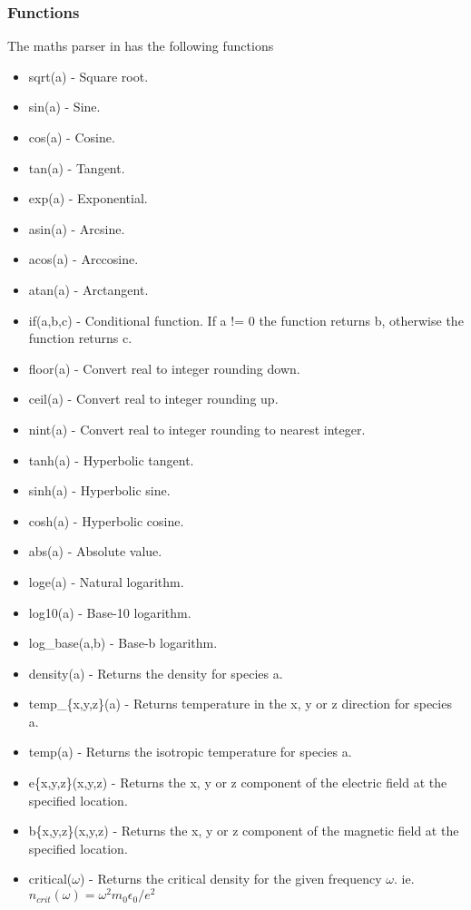 \subsubsection{Functions}
\label{sec:functions}
The maths parser in {\EPOCH} has the following functions
\begin{itemize}
\item sqrt(a) - Square root.
\item sin(a) - Sine.
\item cos(a) - Cosine.
\item tan(a) - Tangent.
\item exp(a) - Exponential.
\item asin(a) - Arcsine.
\item acos(a) - Arccosine.
\item atan(a) - Arctangent.
\item if(a,b,c) - Conditional function. If a != 0 the function returns b,
  otherwise the function returns c.
\item floor(a) - Convert real to integer rounding down.
\item ceil(a) - Convert real to integer rounding up.
\item nint(a) - Convert real to integer rounding to nearest integer.
\item tanh(a) - Hyperbolic tangent.
\item sinh(a) - Hyperbolic sine.
\item cosh(a) - Hyperbolic cosine.
\item abs(a) - Absolute value.
\item loge(a) - Natural logarithm.
\item log10(a) - Base-10 logarithm.
\item log\_base(a,b) - Base-b logarithm.
\item density(a) - Returns the density for species a.
\item temp\_\{x,y,z\}(a) - Returns temperature in the x, y or z direction for
    species a.
\item temp(a) - Returns the isotropic temperature for species a.
\item e\{x,y,z\}(x,y,z) - Returns the x, y or z component of the electric
    field at the specified location.
\item b\{x,y,z\}(x,y,z) - Returns the x, y or z component of the magnetic
    field at the specified location.
\item critical($\omega$) - Returns the critical density for the given
    frequency $\omega$. ie. $n_{crit}(\omega) = \omega^2 m_0 \epsilon_0 / e^2$

\end{itemize}

